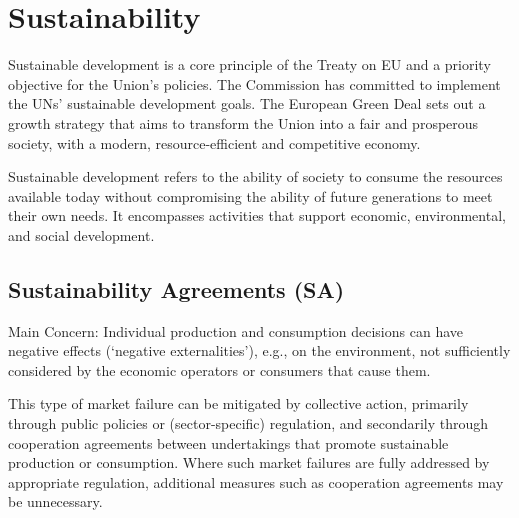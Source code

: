 \newpage

\section{Sustainability}

    Sustainable development is a core principle of the Treaty on EU and a priority objective for the Union’s policies. The Commission has committed to implement the UNs’ sustainable development goals. The European Green Deal sets out a growth strategy that aims to transform the Union into a fair and prosperous society, with a modern, resource-efficient and competitive economy.

    Sustainable development refers to the ability of society to consume the resources available today without compromising the ability of future generations to meet their own needs. It encompasses activities that support economic, environmental, and social development.

    \subsection{Sustainability Agreements (SA)}

        Main Concern: Individual production and consumption decisions can have negative effects (`negative externalities'), e.g., on the environment, not sufficiently considered by the economic operators or consumers that cause them.

        This type of market failure can be mitigated by collective action, primarily through public policies or (sector-specific) regulation, and secondarily through cooperation agreements between undertakings that promote sustainable production or consumption.  
        Where such market failures are fully addressed by appropriate regulation, additional measures such as cooperation agreements may be unnecessary.

